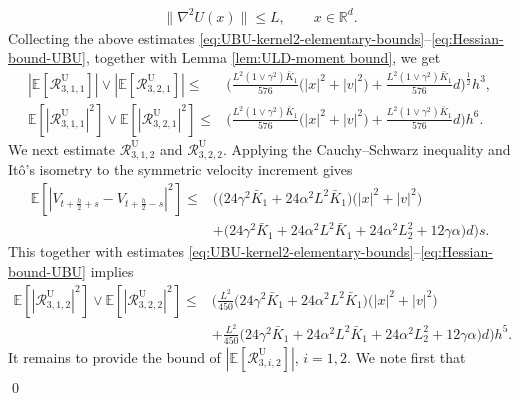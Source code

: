 \documentclass[12pt]{article}
\newenvironment{redtext}
  {\color{black}\ignorespaces}
  {\ignorespacesafterend}
\numberwithin{equation}{section}
\renewenvironment{proof}%
  {\begin{trivlist}%
   \item[]\ignorespaces}%
  {\qed\end{trivlist}}
\newcommand{\E}{\mathbb{E}}
\begin{document}
\begin{redtext}
\begin{proof}
\begin{align}
\|\nabla^2U(x)\|
\leq
L,
\qquad
x\in\mathbb R^d.
\label{eq:Hessian-bound-UBU}
\end{align}
Collecting the above estimates \eqref{eq:UBU-kernel2-elementary-bounds}--\eqref{eq:Hessian-bound-UBU}, together with Lemma \ref{lem:ULD-moment bound},  we get 
\begin{align}
\left|
\E\left[
\mathcal R^{\mathrm U}_{3,1,1}
\right]
\right|
\vee
\left|
\E\left[
\mathcal R^{\mathrm U}_{3,2,1}
\right]
\right|
\leq   &
\Big(
\tfrac{L^2(1\vee\gamma^2)\bar K_1}{576}
\big(
|x|^2+|v|^2
\big)
+
\tfrac{L^2(1\vee\gamma^2)\bar K_1}{576}d
\Big)^{\frac12}
h^3,
\label{eq:R-U-311-321-weak-bounds}
\\
\E\left[
\left|
\mathcal R^{\mathrm U}_{3,1,1}
\right|^2
\right]
\vee
\E\left[
\left|
\mathcal R^{\mathrm U}_{3,2,1}
\right|^2
\right]
\leq  &
\Big(
\tfrac{L^2(1\vee\gamma^2)\bar K_1}{576}
\big(
|x|^2+|v|^2
\big)
+
\tfrac{L^2(1\vee\gamma^2)\bar K_1}{576}d
\Big)h^6.
\label{eq:R-U-311-321-strong-bounds}
\end{align}
We next estimate
$\mathcal R^{\mathrm U}_{3,1,2}$ and
$\mathcal R^{\mathrm U}_{3,2,2}$. Applying the
Cauchy--Schwarz inequality and It\^o's isometry to the symmetric
velocity increment gives
\begin{align}
\E
\left[
\left|
V_{t+\frac h2+s}
-
V_{t+\frac h2-s}
\right|^2
\right]
\leq   &
\Big(
\big(
24\gamma^2\bar K_1
+
24\alpha^2L^2\bar K_1
\big)
\big(
|x|^2+|v|^2
\big)
\nonumber
\\    &
+
\big(
24\gamma^2\bar K_1
+
24\alpha^2L^2\bar K_1
+
24\alpha^2L_2^2
+
12\gamma\alpha
\big)d
\Big)s.
\label{eq:velocity-symmetric-increment-L2}
\end{align}
This together with estimates \eqref{eq:UBU-kernel2-elementary-bounds}--\eqref{eq:Hessian-bound-UBU} implies 
\begin{align}
\E
\left[
\left|
\mathcal R^{\mathrm U}_{3,1,2}
\right|^2
\right]
\vee
\E
\left[
\left|
\mathcal R^{\mathrm U}_{3,2,2}
\right|^2
\right]
\leq   &
\Big(
\tfrac{L^2}{450}
\big(
24\gamma^2\bar K_1
+
24\alpha^2L^2\bar K_1
\big)
\big(
|x|^2+|v|^2
\big)
\nonumber
\\   &
+
\tfrac{L^2}{450}
\big(
24\gamma^2\bar K_1
+
24\alpha^2L^2\bar K_1
+
24\alpha^2L_2^2
+
12\gamma\alpha
\big)d
\Big)h^5.
\label{eq:R-U-312-322-strong-bounds}
\end{align}
It remains to provide the bound of \(|\E[\mathcal R^{\mathrm{U}}_{3,i,2}]|\), \(i=1,2\).
We note first that
\begin{align}

\end{align}
\end{proof}
\end{redtext}
\end{document}
